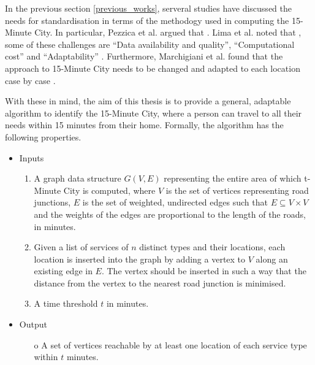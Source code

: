 In the previous section \ref{previous_works}, serveral studies have discussed the needs for standardisation in terms of the methodogy used in computing the 15-Minute City. In particular, Pezzica et al. argued that  \cite{Pezzica_Altafini_Mara_Chioni_2024}. Lima et al. noted that , some of these challenges are “Data availability and quality”, “Computational cost” and “Adaptability” \cite{lima_quest_2023}. Furthermore, Marchigiani et al. found that the approach to 15-Minute City needs to be changed and adapted to each location case by case \cite{marchigiani_urban_2022}.

With these in mind, the aim of this thesis is to provide a general, adaptable algorithm to identify the 15-Minute City, where a person can travel to all their needs within 15 minutes from their home. Formally, the algorithm has the following properties.

\begin{itemize}
    \item Inputs
    \begin{enumerate}
        \item A graph data structure $G(V,E)$ representing the entire area of which t-Minute City is computed, where $V$ is the set of vertices representing road junctions, $E$ is the set of weighted, undirected edges such that $E\subseteq V\times V$ and the weights of the edges are proportional to the length of the roads, in minutes.
        \item Given a list of services of $n$ distinct types and their locations, each location is inserted into the graph by adding a vertex to $V$ along an existing edge in $E$. The vertex should be inserted in such a way that the distance from the vertex to the nearest road junction is minimised.
        \item A time threshold $t$ in minutes.
    \end{enumerate}
    \item Output
    \begin{itemize}
        \item[o] A set of vertices reachable by at least one location of each service type within $t$ minutes.
    \end{itemize}
\end{itemize}